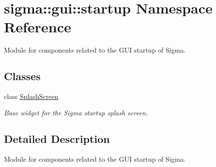\hypertarget{namespacesigma_1_1gui_1_1startup}{\section{sigma\-:\-:gui\-:\-:startup Namespace Reference}
\label{namespacesigma_1_1gui_1_1startup}
}


Module for components related to the G\-U\-I startup of Sigma.  


\subsection*{Classes}
\begin{DoxyCompactItemize}
\item 
class \hyperlink{classsigma_1_1gui_1_1startup_1_1_splash_screen}{Splash\-Screen}
\begin{DoxyCompactList}\small\item\em Base widget for the Sigma startup splash screen. \end{DoxyCompactList}\end{DoxyCompactItemize}


\subsection{Detailed Description}
Module for components related to the G\-U\-I startup of Sigma. 